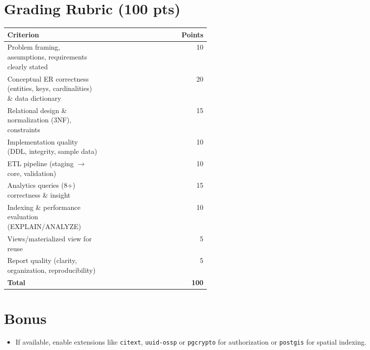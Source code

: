 \documentclass[11pt]{article}
\begin{document}
\section{Grading Rubric (100 pts)}
\begin{center}
\begin{tabular}{p{0.48\linewidth}r}
\toprule
\textbf{Criterion} & \textbf{Points} \\
\midrule
Problem framing, assumptions, requirements clearly stated & 10 \\
Conceptual ER correctness (entities, keys, cardinalities) \& data dictionary & 20 \\
Relational design \& normalization (3NF), constraints & 15 \\
Implementation quality (DDL, integrity, sample data) & 10 \\
ETL pipeline (staging $\rightarrow$ core, validation) & 10 \\
Analytics queries (8+) correctness \& insight & 15 \\
Indexing \& performance evaluation (EXPLAIN/ANALYZE) & 10 \\
Views/materialized view for reuse & 5 \\
Report quality (clarity, organization, reproducibility) & 5 \\
\midrule
\textbf{Total} & \textbf{100} \\
\bottomrule
\end{tabular}
\end{center}

\section{Bonus}
\begin{itemize}[leftmargin=*]
  \item If available, enable extensions like \texttt{citext}, \texttt{uuid-ossp} or \texttt{pgcrypto} for authorization or \texttt{postgis} for spatial indexing.
\end{itemize}
\end{document}
